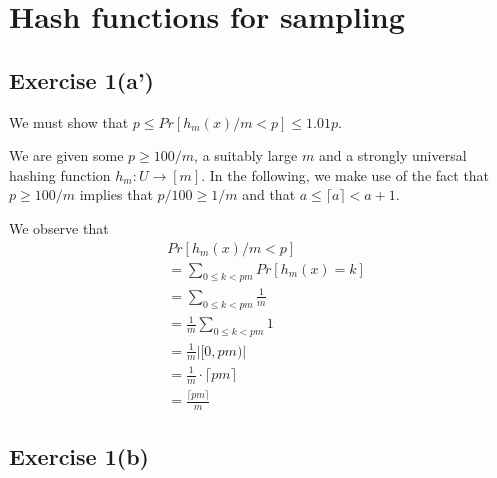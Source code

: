 \section{Hash functions for sampling}
\subsection{Exercise 1(a')}
We must show that $p \leq Pr[h_m(x)/m < p] \leq 1.01p$.

We are given some $p \geq 100/m$, a suitably large $m$ and a strongly universal hashing
function $h_m : U \rightarrow [m]$. In the following, we make use of the fact that 
$p \geq 100/m$ implies that $p/100 \geq 1/m$ and that $a \leq \lceil a \rceil < a+1$.

We observe that
\begin{align}
		& Pr[h_m(x)/m < p] \\
	&= \sum_{0 \leq k < pm} Pr[h_m(x) = k] \\
	&= \sum_{0 \leq k < pm} \frac{1}{m} \\
	&= \frac{1}{m} \sum_{0 \leq k < pm} 1 \\
	&= \frac{1}{m} \left| [0,pm) \right| \\
	&= \frac{1}{m} \cdot \lceil pm \rceil \\
	&= \frac{\lceil pm \rceil}{m}
\end{align}

\subsection{Exercise 1(b)}